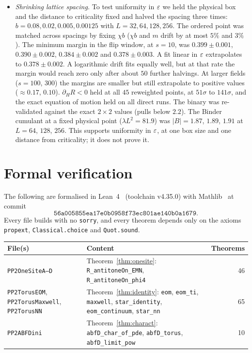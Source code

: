 \begin{itemize}
\item \emph{Shrinking lattice spacing.} To test uniformity in $\varepsilon$ we held the physical box and the distance to criticality fixed and halved the spacing three times: $b=0.08,0.02,0.005,0.00125$ with $L=32,64,128,256$. The ordered point was matched across spacings by fixing $\chi b$ ($\chi b$ and $m$ drift by at most $5\%$ and $3\%$). The minimum margin in the flip window, at $s=10$, was $0.399\pm0.001$, $0.390\pm0.002$, $0.384\pm0.002$ and $0.378\pm0.003$. A fit linear in $\varepsilon$ extrapolates to $0.378\pm0.002$. A logarithmic drift fits equally well, but at that rate the margin would reach zero only after about $50$ further halvings. At larger fields ($s=100$, $300$) the margins are smaller but still extrapolate to positive values ($\approx0.17$, $0.10$). $\partial_HR<0$ held at all $45$ reweighted points, at $51\sigma$ to $141\sigma$, and the exact equation of motion held on all direct runs. The binary was re-validated against the exact $2\times2$ values (pulls below $2.2$). The Binder cumulant at a fixed physical point ($\lambda L^2=81.9$) was $|B|=1.87$, $1.89$, $1.91$ at $L=64$, $128$, $256$. This supports uniformity in $\varepsilon$, at one box size and one distance from criticality; it does not prove it.
\end{itemize}

\section{Formal verification}\label{sec:lean}

The following are formalised in Lean~4~\cite{Lean4} (toolchain v4.35.0) with Mathlib~\cite{Mathlib} at commit
\[\texttt{56a005855ea17e0b0958f73ec801ae140b0a1679}.\] Every file builds with no \texttt{sorry}, and every theorem depends only on the axioms \texttt{propext}, \texttt{Classical.choice} and \texttt{Quot.sound}.

\begin{center}
\small
\begin{tabular}{>{\raggedright}p{3.0cm}>{\raggedright\arraybackslash}p{6.9cm}r}
\toprule
File(s) & Content & Theorems\\
\midrule
\texttt{PP2OneSiteA--D} & Theorem~\ref{thm:onesite}: \texttt{R\_antitoneOn\_EMN}, \texttt{R\_antitoneOn\_phi4} & 46\\
\texttt{PP2TorusEOM}, \texttt{PP2TorusMaxwell}, \texttt{PP2TorusNN} & Theorem~\ref{thm:identity}: \texttt{eom}, \texttt{eom\_ti}, \texttt{maxwell}, \texttt{star\_identity}, \texttt{eom\_continuum}, \texttt{star\_nn} & 65\\
\texttt{PP2ABFDini} & Theorem~\ref{thm:charact}: \texttt{abfD\_char\_of\_pde}, \texttt{abfD\_torus}, \texttt{abfD\_limit\_pow} & 10\\
\bottomrule
\end{tabular}
\end{center}

